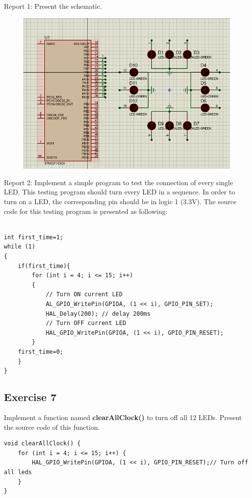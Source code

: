 Report 1: Present the schematic.
\begin{figure}[H]
    \centering
    \includegraphics[width=5in]{source/picture/bai_1/EX6_sche.PNG}
\end{figure}
    Report 2: Implement a simple program to test the connection of every single LED. This testing program should turn every LED in a sequence.
In order to turn on a LED, the corresponding pin should be in logic 1 (3.3V). The source code for this testing program is presented as following:
\begin{lstlisting}[caption=Testing program for Exercise 6]

int first_time=1;
while (1)
{
    if(first_time){
        for (int i = 4; i <= 15; i++)
        {
	        // Turn ON current LED
	        AL_GPIO_WritePin(GPIOA, (1 << i), GPIO_PIN_SET);
	        HAL_Delay(200); // delay 200ms
	        // Turn OFF current LED
	        HAL_GPIO_WritePin(GPIOA, (1 << i), GPIO_PIN_RESET);
        }
    first_time=0;
    }
}
\end{lstlisting}
\subsection{Exercise 7}
Implement a function named \textbf{clearAllClock()} to turn off all 12 LEDs. Present the source code of this function.

\begin{lstlisting}[caption=ClearAllClock function]
void clearAllClock() {
	for (int i = 4; i <= 15; i++) {
	    HAL_GPIO_WritePin(GPIOA, (1 << i), GPIO_PIN_RESET);// Turn off all leds
	}
}
\end{lstlisting}

